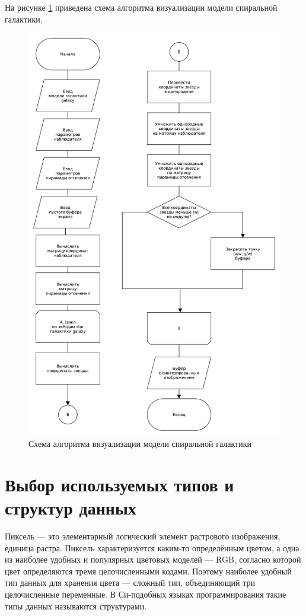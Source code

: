 На рисунке \ref{img:scheme_rendering} приведена схема алгоритма визуализации модели спиральной галактики.
\begin{figure}[H]
    \centering
    \includegraphics[scale=0.4]{pdf/scheme_rendering.pdf}
    \caption{Схема алгоритма визуализации модели спиральной галактики}
    \label{img:scheme_rendering}
\end{figure}

\section{Выбор используемых типов и структур данных}
Пиксель — это элементарный логический элемент растрового изображения, единица растра. Пиксель характеризуется каким-то определённым цветом, а одна из наиболее удобных и популярных цветовых моделей — RGB, согласно которой цвет определяются тремя целочисленными кодами. Поэтому наиболее удобный тип данных для хранения цвета — сложный тип, объединяющий три целочисленные переменные. В Си-подобных языках программирования такие типы данных называются структурами.

